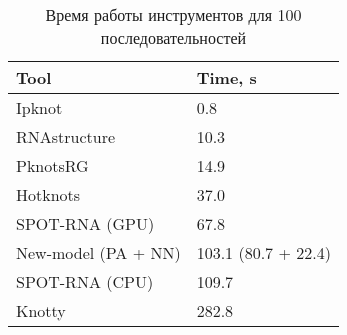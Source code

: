 \begin{table}[h]
\centering
\caption{Время работы инструментов для 100 последовательностей}
\begin{tabular}{|p{5.5cm}||p{4.5cm}|}
\hline
\textbf{Tool} & \textbf{Time, s} \\ \hline\hline
Ipknot & 0.8 \\ \hline
RNAstructure & 10.3 \\ \hline
PknotsRG & 14.9 \\ \hline
Hotknots & 37.0 \\ \hline
SPOT-RNA (GPU) & 67.8 \\ \hline
New-model (PA + NN) & 103.1 (80.7 + 22.4) \\ \hline
SPOT-RNA (CPU) & 109.7 \\ \hline
Knotty & 282.8 \\ \hline
\end{tabular}
\label{time}
\end{table}